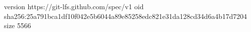 version https://git-lfs.github.com/spec/v1
oid sha256:25a791bca1df10f042e5b6044a89e85258edc821e31da128cd34d6a4b17d7204
size 5566
